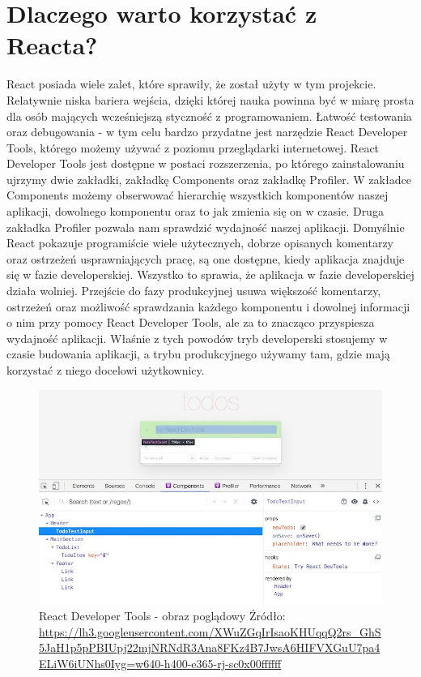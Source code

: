 \documentclass[oneside,polski,logo,indent]{amuthesis}
\begin{document}
\section{Dlaczego warto korzystać z Reacta?}{
React posiada wiele zalet, które sprawiły, że został użyty w tym projekcie. Relatywnie niska bariera wejścia, dzięki której nauka powinna być w miarę prosta dla osób mających wcześniejszą styczność z programowaniem. Łatwość testowania oraz debugowania - w tym celu bardzo przydatne jest narzędzie React Developer Tools, którego możemy używać z poziomu przeglądarki internetowej. React Developer Tools jest dostępne w postaci rozszerzenia, po którego zainstalowaniu ujrzymy dwie zakładki, zakładkę Components oraz zakładkę Profiler. W zakładce Components możemy obserwować hierarchię wszystkich komponentów naszej aplikacji, dowolnego komponentu oraz to jak zmienia się on w czasie. Druga zakładka Profiler pozwala nam sprawdzić wydajność naszej aplikacji. Domyślnie React pokazuje programiście wiele użytecznych, dobrze opisanych komentarzy oraz ostrzeżeń usprawniających pracę, są one dostępne, kiedy aplikacja znajduje się w fazie developerskiej. Wszystko to sprawia, że aplikacja w fazie developerskiej działa wolniej. Przejście do fazy produkcyjnej usuwa większość komentarzy, ostrzeżeń oraz możliwość sprawdzania każdego komponentu i dowolnej informacji o nim przy pomocy React Developer Tools, ale za to znacząco przyspiesza wydajność aplikacji.
Właśnie z tych powodów tryb developerski stosujemy w czasie budowania aplikacji, a trybu produkcyjnego używamy tam, gdzie mają korzystać z niego docelowi użytkownicy.



\begin{figure}[H]
\centering
\includegraphics[width=13cm]{react dev example.jpg}
\caption{React Developer Tools - obraz poglądowy
\newline
Źródło: \url{https://lh3.googleusercontent.com/XWuZGqIrIsaoKHUqqQ2rs_GhS5JaH1p5pPBIUpj22mjNRNdR3Ana8FKz4B7JwsA6HIFVXGuU7pa4ELiW6iUNhs0Iyg=w640-h400-e365-rj-sc0x00ffffff}
}
\label{react dev example.jpg}
\end{figure}

}
\end{document}
